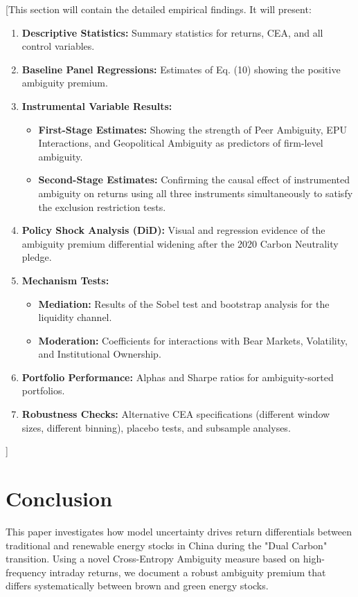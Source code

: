 \documentclass[preprint,12pt,authoryear]{elsarticle}
\begin{document}
[This section will contain the detailed empirical findings. It will present:
\begin{enumerate}
    \item \textbf{Descriptive Statistics:} Summary statistics for returns, CEA, and all control variables.
    \item \textbf{Baseline Panel Regressions:} Estimates of Eq. (10) showing the positive ambiguity premium.
    \item \textbf{Instrumental Variable Results:}
    \begin{itemize}
        \item \textbf{First-Stage Estimates:} Showing the strength of Peer Ambiguity, EPU Interactions, and Geopolitical Ambiguity as predictors of firm-level ambiguity.
        \item \textbf{Second-Stage Estimates:} Confirming the causal effect of instrumented ambiguity on returns using all three instruments simultaneously to satisfy the exclusion restriction tests.
    \end{itemize}
    \item \textbf{Policy Shock Analysis (DiD):} Visual and regression evidence of the ambiguity premium differential widening after the 2020 Carbon Neutrality pledge.
    \item \textbf{Mechanism Tests:}
    \begin{itemize}
        \item \textbf{Mediation:} Results of the Sobel test and bootstrap analysis for the liquidity channel.
        \item \textbf{Moderation:} Coefficients for interactions with Bear Markets, Volatility, and Institutional Ownership.
    \end{itemize}
    \item \textbf{Portfolio Performance:} Alphas and Sharpe ratios for ambiguity-sorted portfolios.
    \item \textbf{Robustness Checks:} Alternative CEA specifications (different window sizes, different binning), placebo tests, and subsample analyses.
\end{enumerate}
]

\section{Conclusion}

This paper investigates how model uncertainty drives return differentials between traditional and renewable energy stocks in China during the "Dual Carbon" transition. Using a novel Cross-Entropy Ambiguity measure based on high-frequency intraday returns, we document a robust ambiguity premium that differs systematically between brown and green energy stocks.
\end{document}

